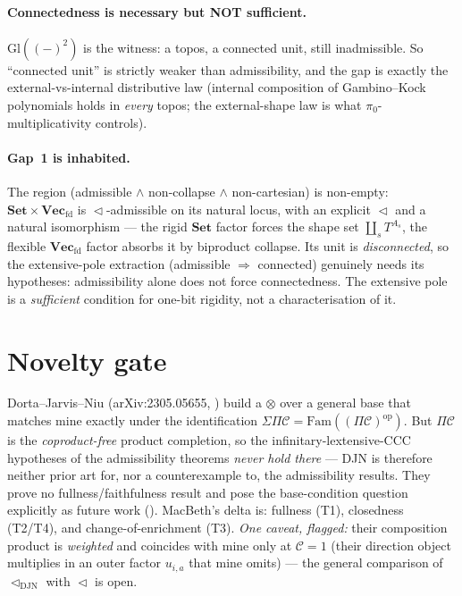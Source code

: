 \documentclass[11pt]{article}
\theoremstyle{plain}
\theoremstyle{definition}
\theoremstyle{remark}
\newcommand{\C}{\mathcal{C}}
\newcommand{\Set}{\mathbf{Set}}
\newcommand{\Vecfd}{\mathbf{Vec}_{\mathrm{fd}}}
\newcommand{\Fam}{\mathrm{Fam}}
\newcommand{\Gl}{\mathrm{Gl}}
\renewcommand{\lhd}{\vartriangleleft}
\newcommand{\op}{\mathrm{op}}
\newcommand{\pizero}{\pi_0}
\begin{document}
\paragraph{Connectedness is necessary but NOT sufficient.} $\Gl((-)^2)$ is the witness: a topos, a
connected unit, still inadmissible. So ``connected unit'' is strictly weaker than admissibility, and
the gap is exactly the external-vs-internal distributive law (internal composition of Gambino--Kock
polynomials holds in \emph{every} topos; the external-shape law is what $\pizero$-multiplicativity
controls).

\paragraph{Gap~1 is inhabited.} The region (admissible $\wedge$ non-collapse $\wedge$ non-cartesian) is
non-empty: $\Set\times\Vecfd$ is $\lhd$-admissible on its natural locus, with an explicit $\lhd$ and a
natural isomorphism --- the rigid $\Set$ factor forces the shape set $\coprod_s T^{A_s}$, the flexible
$\Vecfd$ factor absorbs it by biproduct collapse. Its unit is \emph{disconnected}, so the
extensive-pole extraction (admissible $\Rightarrow$ connected) genuinely needs its hypotheses:
admissibility alone does not force connectedness. The extensive pole is a \emph{sufficient} condition
for one-bit rigidity, not a characterisation of it.

\section{Novelty gate}

Dorta--Jarvis--Niu (arXiv:2305.05655, \cite{DJN}) build a $\otimes$ over a general base that matches
mine exactly under the identification $\Sigma\Pi\C=\Fam((\Pi\C)^\op)$. But $\Pi\C$ is the
\emph{coproduct-free} product completion, so the infinitary-lextensive-CCC hypotheses of the
admissibility theorems \emph{never hold there} --- DJN is therefore neither prior art for, nor a
counterexample to, the admissibility results. They prove no fullness/faithfulness result and pose the
base-condition question explicitly as future work (\cite[\S6]{DJN}). MacBeth's delta is: fullness (T1),
closedness (T2/T4), and change-of-enrichment (T3). \emph{One caveat, flagged:} their composition
product is \emph{weighted} and coincides with mine only at $\C=1$ (their direction object multiplies in
an outer factor $u_{i,a}$ that mine omits) --- the general comparison of $\lhd_{\mathrm{DJN}}$ with
$\lhd$ is open.
\end{document}
